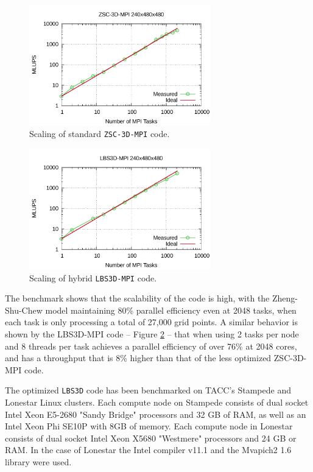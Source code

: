 \documentclass[12pt]{report}
\begin{document}
\begin{figure}[!htb]
\centering
\includegraphics[width=0.7\textwidth]{scaling_mpi.pdf}
\caption{Scaling of standard \texttt{ZSC-3D-MPI} code.}
\label{fig:scaling_mpi}
\end{figure}

\begin{figure}[!htb]
\centering
\includegraphics[width=0.7\textwidth]{scaling_hybrid.pdf}
\caption{Scaling of hybrid \texttt{LBS3D-MPI} code.}
\label{fig:scaling_hybrid}
\end{figure}

The benchmark shows that the scalability of the code is high, with the Zheng-Shu-Chew model maintaining 80\% parallel efficiency even at 2048 tasks, when each task is only processing a total of 27,000 grid points. A similar behavior is shown by the LBS3D-MPI code -- Figure \ref{fig:scaling_hybrid} -- that when using 2 tasks per node and 8 threads per task achieves a parallel efficiency of over 76\% at 2048 cores, and has a throughput that is 8\% higher than that of the less optimized ZSC-3D-MPI code.

The optimized \verb+LBS3D+ code has been benchmarked on TACC's Stampede and Lonestar Linux clusters. Each compute node on Stampede consists of dual socket Intel Xeon E5-2680 "Sandy Bridge" processors and 32 GB of RAM, as well as an Intel Xeon Phi SE10P with 8GB of memory. Each compute node in Lonestar consists of dual socket Intel Xeon X5680 "Westmere" processors and 24 GB or RAM. In the case of Lonestar the Intel compiler v11.1 and the Mvapich2 1.6 library were used.
\end{document}
